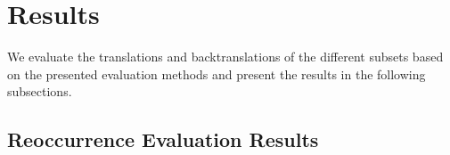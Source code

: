 \section{Results}
\label{ch:Base_Experiment:Results}


We evaluate the translations and backtranslations of the different subsets based on the presented evaluation methods and present the results in the following subsections.

\subsection{Reoccurrence Evaluation Results}
\label{ch:Base_Experiment:Results:Reoccurrence}

